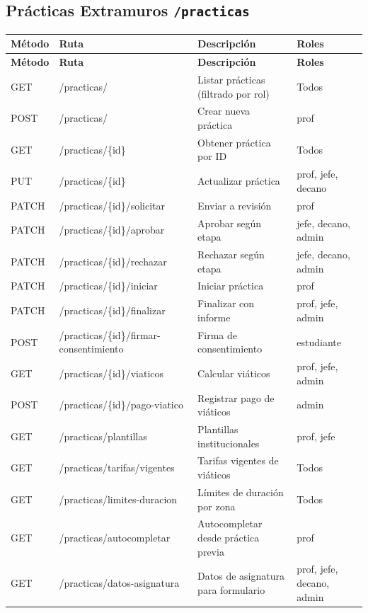 \documentclass[12pt,a4paper]{article}
\begin{document}
\subsection{Prácticas Extramuros \texttt{/practicas}}
\begin{longtable}{>{\ttfamily}p{1.5cm} >{\ttfamily}p{6.5cm} p{3.5cm} p{2cm}}
  \toprule
  \textbf{Método} & \textbf{Ruta} & \textbf{Descripción} & \textbf{Roles} \\
  \midrule
  \endfirsthead
  \toprule \textbf{Método} & \textbf{Ruta} & \textbf{Descripción} & \textbf{Roles} \\ \midrule
  \endhead
  GET    & /practicas/ & Listar prácticas (filtrado por rol) & Todos \\
  POST   & /practicas/ & Crear nueva práctica & prof \\
  GET    & /practicas/\{id\} & Obtener práctica por ID & Todos \\
  PUT    & /practicas/\{id\} & Actualizar práctica & prof, jefe, decano \\
  PATCH  & /practicas/\{id\}/solicitar & Enviar a revisión & prof \\
  PATCH  & /practicas/\{id\}/aprobar & Aprobar según etapa & jefe, decano, admin \\
  PATCH  & /practicas/\{id\}/rechazar & Rechazar según etapa & jefe, decano, admin \\
  PATCH  & /practicas/\{id\}/iniciar & Iniciar práctica & prof \\
  PATCH  & /practicas/\{id\}/finalizar & Finalizar con informe & prof, jefe, admin \\
  POST   & /practicas/\{id\}/firmar-consentimiento & Firma de consentimiento & estudiante \\
  GET    & /practicas/\{id\}/viaticos & Calcular viáticos & prof, jefe, admin \\
  POST   & /practicas/\{id\}/pago-viatico & Registrar pago de viáticos & admin \\
  GET    & /practicas/plantillas & Plantillas institucionales & prof, jefe \\
  GET    & /practicas/tarifas/vigentes & Tarifas vigentes de viáticos & Todos \\
  GET    & /practicas/limites-duracion & Límites de duración por zona & Todos \\
  GET    & /practicas/autocompletar & Autocompletar desde práctica previa & prof \\
  GET    & /practicas/datos-asignatura & Datos de asignatura para formulario & prof, jefe, decano, admin \\
  \bottomrule
\end{longtable}
\end{document}
